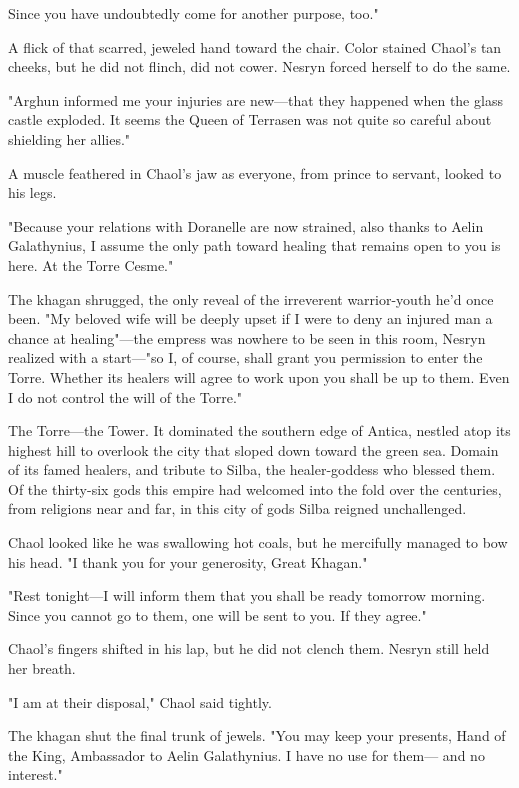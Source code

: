 Since you have undoubtedly come for another purpose, too."

A flick of that scarred, jeweled hand toward the chair. Color stained Chaol's tan cheeks, but he did not flinch, did not cower. Nesryn forced herself to do the same.

"Arghun informed me your injuries are new---that they happened when the glass castle exploded. It seems the Queen of Terrasen was not quite so careful about shielding her allies."

A muscle feathered in Chaol's jaw as everyone, from prince to servant, looked to his legs.

"Because your relations with Doranelle are now strained, also thanks to Aelin Galathynius, I assume the only path toward healing that remains open to you is here. At the Torre Cesme."

The khagan shrugged, the only reveal of the irreverent warrior-youth he'd once been. "My beloved wife will be deeply upset if I were to deny an injured man a chance at healing"---the empress was nowhere to be seen in this room, Nesryn realized with a start---"so I, of course, shall grant you permission to enter the Torre. Whether its healers will agree to work upon you shall be up to them. Even I do not control the will of the Torre."

The Torre---the Tower. It dominated the southern edge of Antica, nestled atop its highest hill to overlook the city that sloped down toward the green sea. Domain of its famed healers, and tribute to Silba, the healer-goddess who blessed them. Of the thirty-six gods this empire had welcomed into the fold over the centuries, from religions near and far, in this city of gods  Silba reigned unchallenged.

Chaol looked like he was swallowing hot coals, but he mercifully managed to bow his head. "I thank you for your generosity, Great Khagan."

"Rest tonight---I will inform them that you shall be ready tomorrow morning. Since you cannot go to them, one will be sent to you. If they agree."

Chaol's fingers shifted in his lap, but he did not clench them. Nesryn still held her breath.

"I am at their disposal," Chaol said tightly.

The khagan shut the final trunk of jewels. "You may keep your presents, Hand of the King, Ambassador to Aelin Galathynius. I have no use for them--- and no interest."

